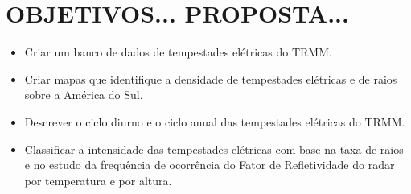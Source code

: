 

\section{OBJETIVOS... PROPOSTA...}

\begin{itemize}

\item Criar um banco de dados de tempestades elétricas do TRMM. 

\item Criar mapas que identifique a densidade de tempestades elétricas e de raios sobre a América do Sul.

\item Descrever o ciclo diurno e o ciclo anual das tempestades elétricas do TRMM.

\item Classificar a intensidade das tempestades elétricas com base na taxa de raios e no estudo da frequência de ocorrência do Fator de Refletividade do radar por temperatura e por altura. 

\end{itemize}
